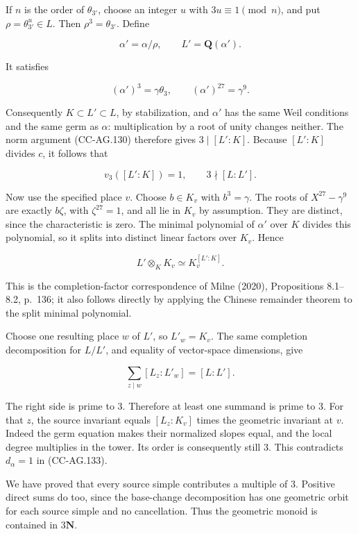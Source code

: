 If \(n\) is the order of \(\theta_{3'}\), choose an integer \(u\) with
\(3u\equiv1\pmod n\), and put \(\rho=\theta_{3'}^u\in L\). Then
\(\rho^3=\theta_{3'}\). Define

\[
 \alpha'=\alpha/\rho,\qquad L'=\mathbf Q(\alpha').
\]

It satisfies

\[
 (\alpha')^3=\gamma\theta_3,
 \qquad (\alpha')^{27}=\gamma^9.
 \tag{CC-AG.135}
\]

Consequently \(K\subset L'\subset L\), by stabilization, and \(\alpha'\)
has the same Weil conditions and the same germ as \(\alpha\):
multiplication by a root of unity changes neither. The norm argument
(CC-AG.130) therefore gives \(3\mid[L':K]\). Because \([L':K]\) divides
\(c\), it follows that

\[
 v_3([L':K])=1,\qquad 3\nmid[L:L'].
 \tag{CC-AG.136}
\]

Now use the specified place \(v\). Choose \(b\in K_v\) with
\(b^3=\gamma\). The roots of \(X^{27}-\gamma^9\) are exactly \(b\zeta\),
with \(\zeta^{27}=1\), and all lie in \(K_v\) by assumption. They are
distinct, since the characteristic is zero. The minimal polynomial of
\(\alpha'\) over \(K\) divides this polynomial, so it splits into
distinct linear factors over \(K_v\). Hence

\[
 L'\otimes_K K_v\simeq K_v^{[L':K]}.
 \tag{CC-AG.137}
\]

This is the completion-factor correspondence of Milne (2020),
Propositions 8.1--8.2, p.~136; it also follows directly by applying the
Chinese remainder theorem to the split minimal polynomial.

Choose one resulting place \(w\) of \(L'\), so \(L'_w=K_v\). The same
completion decomposition for \(L/L'\), and equality of vector-space
dimensions, give

\[
 \sum_{z\mid w}[L_z:L'_w]=[L:L'].
 \tag{CC-AG.138}
\]

The right side is prime to \(3\). Therefore at least one summand is
prime to \(3\). For that \(z\), the source invariant equals
\([L_z:K_v]\) times the geometric invariant at \(v\). Indeed the germ
equation makes their normalized slopes equal, and the local degree
multiplies in the tower. Its order is consequently still \(3\). This
contradicts \(d_\alpha=1\) in (CC-AG.133).

We have proved that every source simple contributes a multiple of \(3\).
Positive direct sums do too, since the base-change decomposition has one
geometric orbit for each source simple and no cancellation. Thus the
geometric monoid is contained in \(3\mathbf N\).

